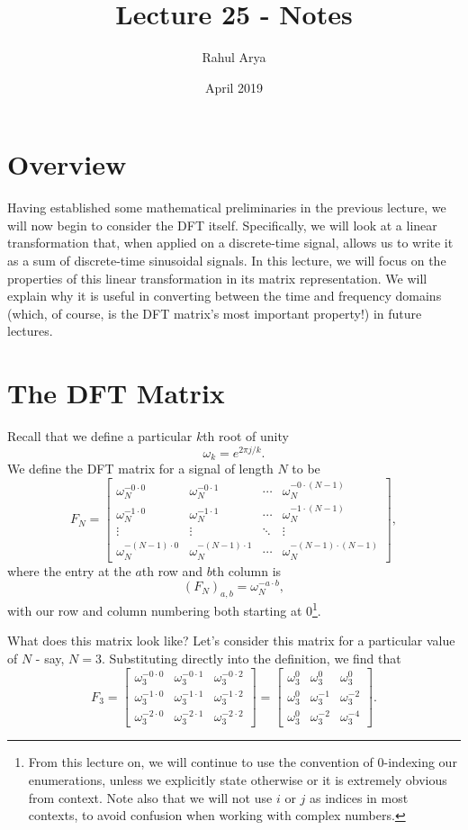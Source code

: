 \documentclass[letterpaper]{article}
\title{Lecture 25 - Notes}
\author{Rahul Arya}
\date{April 2019}
\theoremstyle{remark}
\newcommand{\mat}[1]{\ensuremath{\begin{bmatrix}#1\end{bmatrix}}}
\begin{document}
\maketitle

\section{Overview}
Having established some mathematical preliminaries in the previous lecture, we will now begin to consider the DFT itself. Specifically, we will look at a linear transformation that, when applied on a discrete-time signal, allows us to write it as a sum of discrete-time sinusoidal signals. In this lecture, we will focus on the properties of this linear transformation in its matrix representation. We will explain why it is useful in converting between the time and frequency domains (which, of course, is the DFT matrix's most important property!) in future lectures.

\section{The DFT Matrix}
Recall that we define a particular $k$th root of unity
\[
    \omega_k = e^{2\pi j / k}.
\]
We define the DFT matrix for a signal of length $N$ to be
\[
    F_N = \mat{
    \omega_N^{-0 \cdot 0} & \omega_N^{-0 \cdot 1} & \cdots & \omega_N^{-0 \cdot (N-1)} \\
    \omega_N^{-1 \cdot 0} & \omega_N^{-1 \cdot 1} & \cdots & \omega_N^{-1 \cdot (N-1)} \\
    \vdots & \vdots & \ddots & \vdots \\
    \omega_N^{-(N-1) \cdot 0} & \omega_N^{-(N-1) \cdot 1} & \cdots & \omega_N^{-(N-1) \cdot (N-1)}},
\]
where the entry at the $a$th row and $b$th column is
\[
    (F_N)_{a,b} = \omega_N^{-a\cdot b},
\]
with our row and column numbering both starting at $0$\footnote{From this lecture on, we will continue to use the convention of $0$-indexing our enumerations, unless we explicitly state otherwise or it is extremely obvious from context. Note also that we will not use $i$ or $j$ as indices in most contexts, to avoid confusion when working with complex numbers.}.

What does this matrix look like? Let's consider this matrix for a particular value of $N$ - say, $N = 3$. Substituting directly into the definition, we find that
\[
    F_3 = \mat{
    \omega_3^{-0 \cdot 0} & \omega_3^{-0 \cdot 1} & \omega_3^{-0 \cdot 2} \\
    \omega_3^{-1 \cdot 0} & \omega_3^{-1 \cdot 1} & \omega_3^{-1 \cdot 2} \\
    \omega_3^{-2 \cdot 0} & \omega_3^{-2 \cdot 1} & \omega_3^{-2 \cdot 2}} = \mat{
    \omega_3^{0} & \omega_3^{0} & \omega_3^{0} \\
    \omega_3^{0} & \omega_3^{-1} & \omega_3^{-2} \\
    \omega_3^{0} & \omega_3^{-2} & \omega_3^{-4}}.
\]
\end{document}
